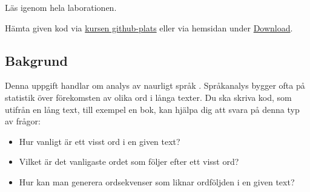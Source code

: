 


\Lab{\LabWeekNINE}
\begin{Goals}

\end{Goals}

\begin{Preparations}
\item {}
\item Läs igenom hela laborationen.
\item Hämta given kod via \href{https://github.com/lunduniversity/introprog/tree/master/workspace/}{kursen github-plats} eller via hemsidan under \href{https://cs.lth.se/pgk/download/}{Download}.
\end{Preparations}


\subsection{Bakgrund}

Denna uppgift handlar om analys av naurligt språk . Språkanalys bygger ofta på statistik över förekomsten av olika ord i långa texter. Du ska skriva kod, som utifrån en lång text, till exempel en bok, kan hjälpa dig att svara på denna typ av frågor:
\begin{itemize}[noitemsep]
\item Hur vanligt är ett visst ord i en given text?
\item Vilket är det vanligaste ordet som följer efter ett visst ord?
\item Hur kan man generera ordsekvenser som liknar ordföljden i en given text?
\end{itemize}

